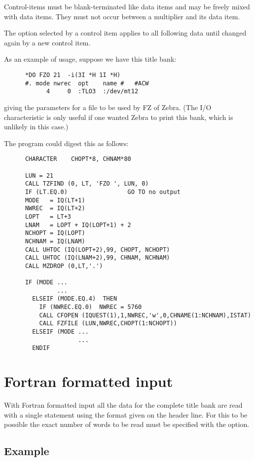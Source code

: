 Control-items must be blank-terminated like data items
and may be freely mixed with data items.
They must not occur between a multiplier and its data item.

The option selected by a control item applies to all following
data until changed again by a new control item.

As an example of usage, suppose we have this title bank:

\begin{verbatim}
      *DO FZO 21  -i(3I *H 1I *H)
      #. mode nwrec  opt    name #   #ACW
            4     0  :TLO3  :/dev/mt12
\end{verbatim}

giving the parameters for a file to be used by FZ of Zebra.
(The I/O characteristic is only useful if one wanted Zebra
 to print this bank, which is unlikely in this case.)

The program could digest this as follows:
\begin{verbatim}
      CHARACTER    CHOPT*8, CHNAM*80

      LUN = 21
      CALL TZFIND (0, LT, 'FZO ', LUN, 0)
      IF (LT.EQ.0)                 GO TO no output
      MODE   = IQ(LT+1)
      NWREC  = IQ(LT+2)
      LOPT   = LT+3
      LNAM   = LOPT + IQ(LOPT+1) + 2
      NCHOPT = IQ(LOPT)
      NCHNAM = IQ(LNAM)
      CALL UHTOC (IQ(LOPT+2),99, CHOPT, NCHOPT)
      CALL UHTOC (IQ(LNAM+2),99, CHNAM, NCHNAM)
      CALL MZDROP (0,LT,'.')

      IF (MODE ...
               ...
        ELSEIF (MODE.EQ.4)  THEN
          IF (NWREC.EQ.0)  NWREC = 5760
          CALL CFOPEN (IQUEST(1),1,NWREC,'w',0,CHNAME(1:NCHNAM),ISTAT)
          CALL FZFILE (LUN,NWREC,CHOPT(1:NCHOPT))
        ELSEIF (MODE ...
                     ...
        ENDIF
\end{verbatim} 

\newpage
{}
\section{Fortran formatted input}

With Fortran formatted input all the data for the complete title bank
are read with a single  statement using the format given
on the header line.
For this to be possible the exact number of words to be read
must be specified with the  option.

\subsection*{Example}

